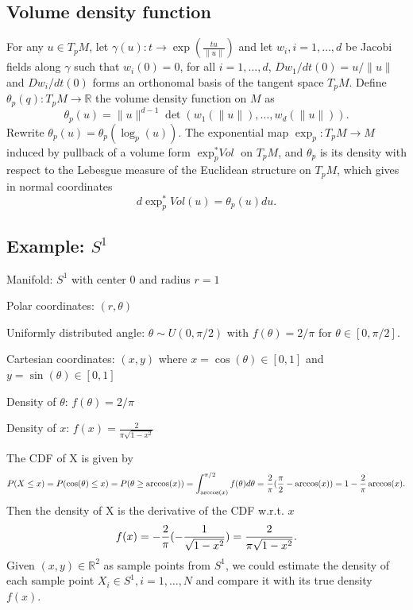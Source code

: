 \documentclass[11pt,a4paper,]{article}
\begin{document}
\hypertarget{volume-density-function}{%
\subsection{Volume density function}\label{volume-density-function}}

For any \(u \in T_pM\), let
\(\gamma(u): t \rightarrow \exp(\frac{tu}{\|u\|})\) and let
\(w_i, i=1,\dots,d\) be Jacobi fields along \(\gamma\) such that \(w_i(0)=0\),
for all \(i=1,\dots,d\), \(Dw_1/dt(0)=u/\|u\|\) and \(Dw_i/dt(0)\) forms an
orthonomal basis of the tangent space \(T_pM\). Define
\(\theta_p(q): T_pM \rightarrow \mathbb{R}\) the volume density function
on \(M\) as \[
\theta_p(u) = \|u\|^{d-1} \det(w_1(\|u\|),\dots,w_d(\|u\|)).
\]
Rewrite \(\theta_p(u) = \theta_p(\log_p(u))\). The exponential
map \(\exp_p: T_pM \rightarrow M\) induced by pullback of a volume form
\(\exp_p^*\textit{Vol}\) on \(T_pM\), and \(\theta_p\) is its density with
respect to the Lebesgue measure of the Euclidean structure on \(T_pM\),
which gives in normal coordinates \[
d\exp_p^*\textit{Vo}l(u) = \theta_p(u)du.
\]

\hypertarget{example-s1}{%
\subsection{\texorpdfstring{Example: \(S^1\)}{Example: S\^{}1}}\label{example-s1}}

Manifold: \(S^1\) with center 0 and radius \(r=1\)

Polar coordinates: \((r, \theta)\)

Uniformly distributed angle: \(\theta \sim U(0, \pi/2)\) with
\(f(\theta) = 2 / \pi\) for \(\theta \in [0, \pi /2]\).

Cartesian coordinates: \((x, y)\) where \(x = \cos(\theta) \in [0, 1]\) and
\(y = \sin(\theta) \in [0, 1]\)

Density of \(\theta\): \(f(\theta) = 2 / \pi\)

Density of \(x\): \(f(x) = \frac{2}{\pi \sqrt{1-x^2}}\)

The CDF of X is given by \[
P(X \leq x) = P(\cos(\theta) \leq x) \\
= P(\theta \geq \arccos(x)) \\
= \int_{\arccos(x)}^{\pi/2} f(\theta) d\theta \\
=  \frac{2}{\pi} (\frac{\pi}{2} - \arccos(x) ) \\
= 1 - \frac{2}{\pi} \arccos(x).
\] Then the density of X is the derivative of the CDF w.r.t. \(x\) \[
f(x) = -\frac{2}{\pi} (-\frac{1}{\sqrt{1 - x^2}}) \\
= \frac{2}{\pi \sqrt{1 - x^2}}.
\] Given \((x, y) \in \mathbb{R}^2\) as sample points from \(S^1\), we could
estimate the density of each sample point \(X_i \in S^1, i = 1, \dots, N\)
and compare it with its true density \(f(x)\).
\end{document}
